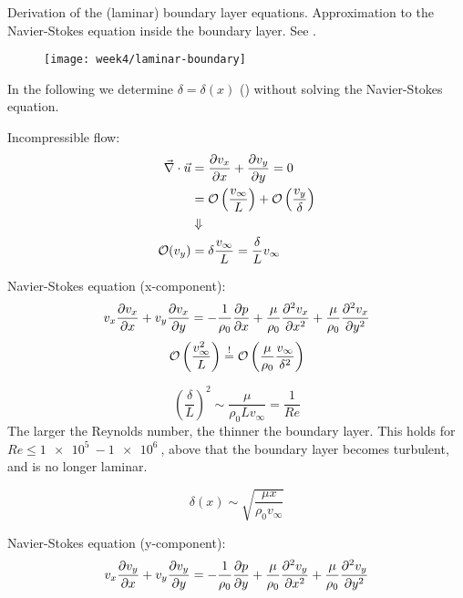Derivation of the (laminar) boundary layer equations. Approximation to the Navier-Stokes equation inside the boundary layer. See .

\begin{figure}[ht]
    \centering
    \texttt{[image: week4/laminar-boundary]}\\
    \caption{}
    \label{fig:laminar-boundary}
\end{figure}

In the following we determine $\delta = \delta(x)$ () without solving the Navier-Stokes equation.

Incompressible flow:
\begin{align}
\vec{\nabla}\cdot\vec{u} &= \frac{\partial v_x}{\partial x} + \frac{\partial v_y}{\partial y} = 0 \\
&= \mathcal{O} \left(\frac{v_\infty}{L}\right) + \mathcal{O} \left(\frac{v_y}{\delta}\right) \\
&\Downarrow\notag\\
\mathcal{O}(v_y) &= \delta\frac{v_\infty}{L} = \frac{\delta}{L}v_\infty
\end{align}

Navier-Stokes equation (x-component):
\begin{equation}
v_x\frac{\partial v_x}{\partial x} + v_y\frac{\partial v_x}{\partial y} = -\frac{1}{\rho_0}\frac{\partial p}{\partial x} + \frac{\mu}{\rho_0}\frac{\partial^2 v_x}{\partial x^2} + \frac{\mu}{\rho_0}\frac{\partial^2 v_x}{\partial y^2}
\end{equation}
\begin{equation}
\mathcal{O} \left(\frac{v_\infty^2}{L}\right) \overset{!}{=} \mathcal{O} \left(\frac{\mu}{\rho_0}\frac{v_\infty}{\delta^2}\right)
\end{equation}

\begin{equation}
\left(\frac{\delta}{L}\right)^2 \sim \frac{\mu}{\rho_0 L v_\infty} = \frac{1}{Re}
\end{equation}
The larger the Reynolds number, the thinner the boundary layer. This holds for $Re \leq \SI{1e5}{}-\SI{1e6}{}$, above that the boundary layer becomes turbulent, and is no longer laminar.

\begin{equation}
\delta(x) \sim \sqrt{\frac{\mu x}{\rho_0 v_\infty}}
\end{equation}


Navier-Stokes equation (y-component):
\begin{equation}
v_x\frac{\partial v_y}{\partial x} + v_y\frac{\partial v_y}{\partial y} = -\frac{1}{\rho_0}\frac{\partial p}{\partial y} + \frac{\mu}{\rho_0}\frac{\partial^2 v_y}{\partial x^2} + \frac{\mu}{\rho_0}\frac{\partial^2 v_y}{\partial y^2}
\end{equation}


